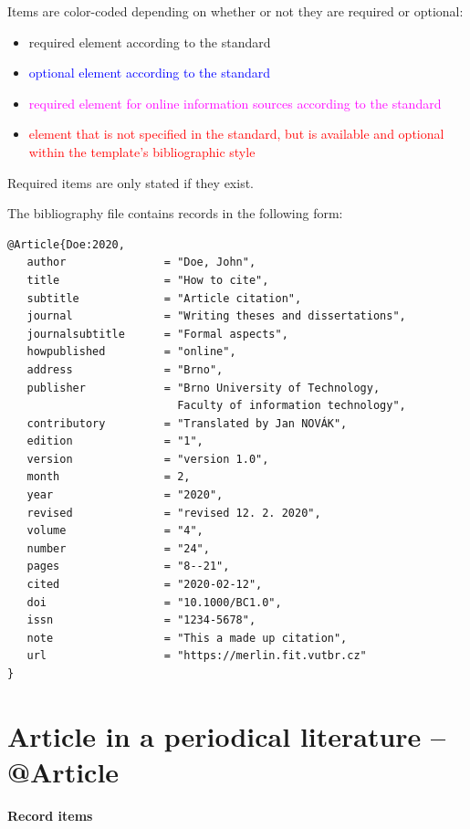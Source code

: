 \noindent Items are color-coded depending on whether or not they are required or optional:
\begin{itemize}
    \item required element according to the standard
    \item \textcolor{blue}{optional element according to the standard}
    \item \textcolor{magenta}{required element for online information sources according to the standard}
    \item \textcolor{red}{element that is not specified in the standard, but is available and optional within the template's bibliographic style}
\end{itemize}
Required items are only stated if they exist.

\newpage
The bibliography file contains records in the following form:
\begin{verbatim}
@Article{Doe:2020,
   author               = "Doe, John",
   title                = "How to cite",
   subtitle             = "Article citation",
   journal              = "Writing theses and dissertations",
   journalsubtitle      = "Formal aspects",
   howpublished         = "online",
   address              = "Brno",
   publisher            = "Brno University of Technology, 
                          Faculty of information technology",
   contributory         = "Translated by Jan NOVÁK",
   edition              = "1",
   version              = "version 1.0",
   month                = 2,
   year                 = "2020",
   revised              = "revised 12. 2. 2020",
   volume               = "4",
   number               = "24",
   pages                = "8--21",
   cited                = "2020-02-12",
   doi                  = "10.1000/BC1.0",
   issn                 = "1234-5678",
   note                 = "This a made up citation",
   url                  = "https://merlin.fit.vutbr.cz"
}
\end{verbatim}


\newpage
\section*{Article in a periodical literature -- @Article}
\label{pr-casopis-clanek}
\noindent \textbf{Record items}

\medskip


